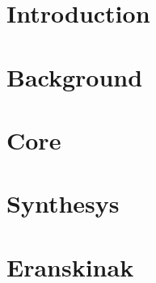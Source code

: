 \documentclass[12pt,a4paper]{book}
\renewcommand{\=}{"-}
\begin{document}
\frontmatter





\setcounter{tocdepth}{3}
\tableofcontents
\newpage
\listoffigures
\newpage
\listoftables
\newpage



 

\mainmatter

\part{Introduction}

\part{Background}
 




\part{Core}



\part{Synthesys}
\part{Eranskinak}
   

%

\nocite{*}


\end{document}
